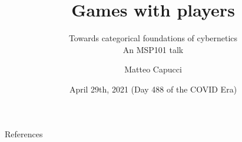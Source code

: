 \documentclass[english]{presentation}
\title{Games with players}
\subtitle{Towards categorical foundations of cybernetics\\[3ex]{\color{colormain}An MSP101 talk}}
\institute{University of Strathclyde}
\author{Matteo Capucci}
\date{April 29th, 2021 (Day 488 of the COVID Era)}
\begin{document}
	\begin{frame}[plain]
		\maketitle
	\end{frame}

	
	
	
	

	\begin{framecard}
		{\color{white}
		\bfseries

		}
	\end{framecard}

	\begin{frame}{References}
		\nocite{*}
		\printbibliography
	\end{frame}
\end{document}
